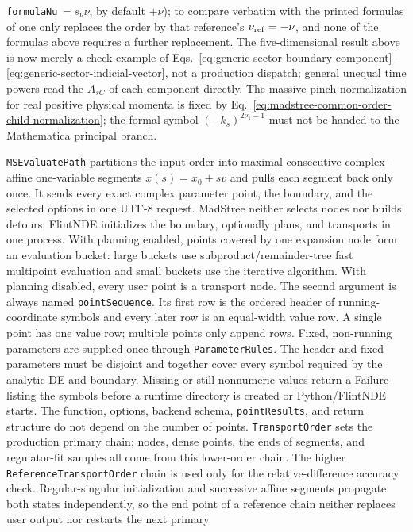 \documentclass[11pt,a4paper]{article}
\begin{document}
\texttt{formulaNu}$\,=s_\nu\nu$, by default $+\nu$); to compare verbatim with the printed formulas of
\cite{Chen:2024jms} one only replaces the order by that reference's $\nu_{\rm ref}=-\nu$, and none of the
formulas above requires a further replacement. The five-dimensional result above is now merely a check example of Eqs.~\eqref{eq:generic-sector-boundary-component}--\eqref{eq:generic-sector-indicial-vector}, not a production dispatch; general unequal time powers read the $A_{sC}$ of each component directly. The massive pinch normalization for real positive physical momenta is fixed by Eq.~\eqref{eq:madstree-common-order-child-normalization}; the formal symbol $(-k_s)^{2\nu_1-1}$ must not be handed to the Mathematica principal branch.

\texttt{MSEvaluatePath} partitions the input order into maximal consecutive complex-affine
one-variable segments $x(s)=x_0+s v$ and pulls each segment back only once. It sends every
exact complex parameter point, the boundary, and the selected options in one UTF-8 request.
MadStree neither selects nodes nor builds detours; FlintNDE initializes the boundary, optionally
plans, and transports in one process. With planning enabled, points covered by one expansion
node form an evaluation bucket: large buckets use subproduct/remainder-tree fast multipoint
evaluation and small buckets use the iterative algorithm. With planning disabled, every user
point is a transport node. The second argument is always named \texttt{pointSequence}.
Its first row is the ordered header of running-coordinate symbols and every later row is an
equal-width value row. A single point has one value row; multiple points only append rows.
Fixed, non-running parameters are supplied once through \texttt{ParameterRules}. The header and
fixed parameters must be disjoint and together cover every symbol required by the analytic DE and
boundary. Missing or still nonnumeric values return a Failure listing the symbols before a runtime
directory is created or Python/FlintNDE starts. The function, options, backend schema,
\texttt{pointResults}, and return structure do not depend on the number of points.
\texttt{TransportOrder} sets the production primary chain; nodes,
dense points, the ends of segments, and regulator-fit samples all come from this lower-order chain.
The higher \texttt{ReferenceTransportOrder} chain is used only for the relative-difference accuracy
check. Regular-singular initialization and successive affine segments propagate both states
independently, so the end point of a reference chain neither replaces user output nor restarts the next primary
\end{document}
